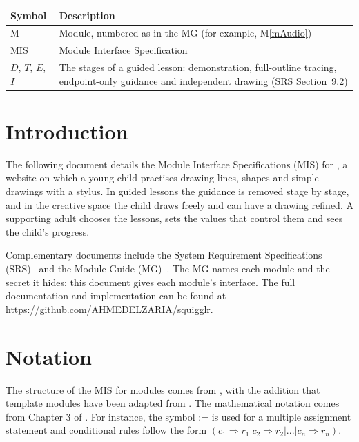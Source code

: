 \documentclass[12pt, titlepage]{article}
\newcommand{\mref}[1]{M\ref{#1}}
\begin{document}
\begin{center}
\renewcommand{\arraystretch}{1.2}
\begin{tabular}{l p{}}
\toprule
\textbf{Symbol} & \textbf{Description}\\
\midrule
M & Module, numbered as in the MG (for example, \mref{mAudio})\\
MIS & Module Interface Specification\\
$D$, $T$, $E$, $I$ & The stages of a guided lesson: demonstration, full-outline
tracing, endpoint-only guidance and independent drawing (SRS
Section~9.2)\\
\bottomrule
\end{tabular}
\end{center}

\newpage

\tableofcontents

\newpage


\section{Introduction}

The following document details the Module Interface Specifications (MIS) for
\progname{}, a website on which a young child practises drawing lines, shapes
and simple drawings with a stylus. In guided lessons the guidance is removed
stage by stage, and in the creative space the child draws freely and can have a
drawing refined. A supporting adult chooses the lessons, sets the values that
control them and sees the child's progress.

Complementary documents include the System Requirement Specifications
(SRS)~\citep{SRS} and the Module Guide (MG)~\citep{MG}. The MG names each module
and the secret it hides; this document gives each module's interface. The full
documentation and implementation can be found at
\url{https://github.com/AHMEDELZARIA/squigglr}.

\section{Notation}

The structure of the MIS for modules comes from \citet{HoffmanAndStrooper1995},
with the addition that template modules have been adapted from
\cite{GhezziEtAl2003}.  The mathematical notation comes from Chapter 3 of
\citet{HoffmanAndStrooper1995}.  For instance, the symbol := is used for a
multiple assignment statement and conditional rules follow the form $(c_1
\Rightarrow r_1 | c_2 \Rightarrow r_2 | ... | c_n \Rightarrow r_n )$.
\end{document}
